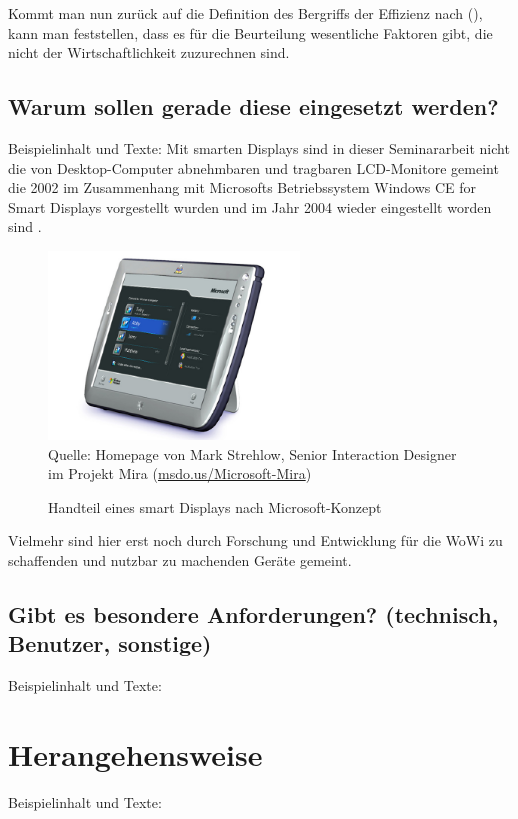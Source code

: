 \documentclass[12pt,oneside,titlepage]{scrartcl}
\begin{document}
Kommt man nun zurück auf die Definition des Bergriffs der Effizienz nach \citeauthor{eichhorn2016} (\citeyear[S. 183 f.]{eichhorn2016}), kann man feststellen, dass es für die Beurteilung wesentliche Faktoren gibt, die nicht der Wirtschaftlichkeit zuzurechnen sind.



\subsection{Warum sollen gerade diese eingesetzt werden?}
Beispielinhalt und Texte:
Mit smarten Displays sind in dieser Seminararbeit nicht die von Desktop-Computer abnehmbaren und tragbaren LCD-Monitore gemeint die 2002 im Zusammenhang mit Microsofts Betriebssystem \glqq{}Windows CE for Smart Displays\grqq{} vorgestellt wurden \parencite{heise-ms-sd} und im Jahr 2004 wieder eingestellt worden sind \parencite{ct-3-2004}. 

\begin{figure}[H]
	\caption{Handteil eines smart Displays nach Microsoft-Konzept}\label{fig:HandteilMSsmartDisplay}
	\includegraphics[height=5cm,keepaspectratio]{mira}
	\\
	Quelle: Homepage von Mark Strehlow, Senior Interaction Designer\\ im Projekt Mira (\href{https://msdo.us/Microsoft-Mira}{msdo.us/Microsoft-Mira})
\end{figure}

Vielmehr sind hier erst noch durch Forschung und Entwicklung für die \ac{WoWi} zu schaffenden und nutzbar zu machenden Geräte gemeint.


\subsection{Gibt es besondere Anforderungen? (technisch, Benutzer, sonstige)}
Beispielinhalt und Texte:

\newpage
\section{Herangehensweise}
Beispielinhalt und Texte:
\end{document}
